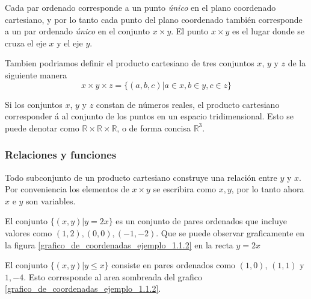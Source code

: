 Cada par ordenado corresponde a un punto \textit{único} en el plano coordenado cartesiano, y por lo tanto cada punto del plano coordenado también corresponde a un par ordenado \textit{único} en el conjunto \(x \times y\). El punto \(x \times y\) es el lugar donde se cruza el eje \(x\) y el eje \(y\). 

Tambien podriamos definir el producto cartesiano de tres conjuntos \(x\), \(y\) y \(z\) de la siguiente manera
\[
x \times y \times z = \{(a,b,c) | a \in x , b \in y , c \in z\}
\]

Si los conjuntos \(x\), \(y\) y \(z\) constan de números reales, el producto cartesiano corresponder á al conjunto de los puntos en un espacio tridimensional. Esto se puede denotar como \(\mathbb{R} \times \mathbb{R} \times \mathbb{R}\), o de forma concisa \(\mathbb{R}^3\).


\subsubsection{Relaciones y funciones}

Todo subconjunto de un producto cartesiano construye una relación entre \(y\) y \(x\). Por conveniencia los elementos de \(x \times y\) se escribira como \(x,y\), por lo tanto ahora \(x\) e \(y\) son variables.

\begin{ejemplo}
    \label{ejemplo_1.1.2}
    El conjunto \(\{(x,y)|y=2x\}\) es un conjunto de pares ordenados que incluye valores como \((1,2),(0,0),(-1,-2)\). Que se puede observar graficamente en la figura \ref{grafico_de_coordenadas_ejemplo_1.1.2} en la recta \(y=2x\)

    El conjunto \(\{(x,y)|y \leq x\}\) consiste en pares ordenados como \((1,0)\), \((1,1)\) y  \(1,-4\). Esto corresponde al area sombreada del grafico \ref{grafico_de_coordenadas_ejemplo_1.1.2}.
\end{ejemplo}


